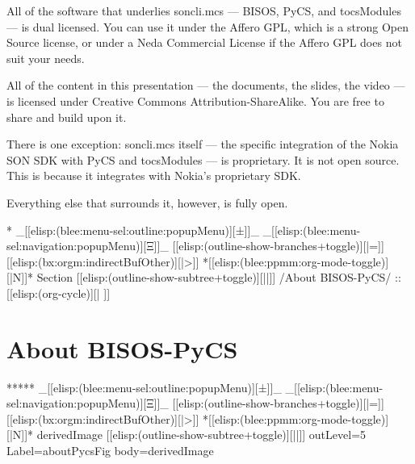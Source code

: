 \begin{verblatex}
\begin{frame}[fragile,plain,label=afferoGpl]
{  All of the software that underlies soncli.mcs --- BISOS, PyCS, and tocsModules ---
  is dual licensed. You can use it under the Affero GPL, which is a strong Open Source
  license, or under a Neda Commercial License if the Affero GPL does not suit your needs.

  All of the content in this presentation --- the documents, the slides, the video ---
  is licensed under Creative Commons Attribution-ShareAlike. You are free to share and
  build upon it.

  There is one exception: soncli.mcs itself --- the specific integration of the Nokia
  SON SDK with PyCS and tocsModules --- is proprietary. It is not open source.
  This is because it integrates with Nokia's proprietary SDK.

  Everything else that surrounds it, however, is fully open.
}

\end{frame}
\end{verblatex}


\begin{whenOrg}
*  _[[elisp:(blee:menu-sel:outline:popupMenu)][±]]_ _[[elisp:(blee:menu-sel:navigation:popupMenu)][Ξ]]_ [[elisp:(outline-show-branches+toggle)][|=]] [[elisp:(bx:orgm:indirectBufOther)][|>]] *[[elisp:(blee:ppmm:org-mode-toggle)][|N]]*  Section    [[elisp:(outline-show-subtree+toggle)][||]]   /About BISOS-PyCS/ ::  [[elisp:(org-cycle)][| ]]
\end{whenOrg}

\section{About BISOS-PyCS}

\begin{whenOrg}
*****  _[[elisp:(blee:menu-sel:outline:popupMenu)][±]]_ _[[elisp:(blee:menu-sel:navigation:popupMenu)][Ξ]]_ [[elisp:(outline-show-branches+toggle)][|=]] [[elisp:(bx:orgm:indirectBufOther)][|>]] *[[elisp:(blee:ppmm:org-mode-toggle)][|N]]*  derivedImage [[elisp:(outline-show-subtree+toggle)][||]] outLevel=5 Label=aboutPycsFig  body=derivedImage

\end{whenOrg}

